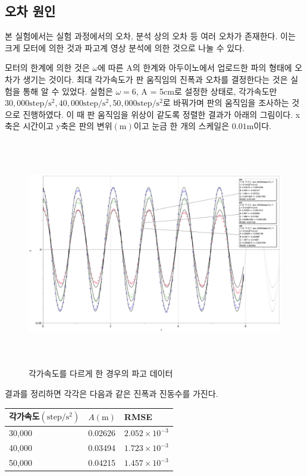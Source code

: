 \subsection{오차 원인}

본 실험에서는 실험 과정에서의 오차, 분석 상의 오차 등 여러 오차가 존재한다. 이는 크게 모터에 의한 것과 파고계 영상 분석에 의한 것으로 나눌 수 있다.

모터의 한계에 의한 것은 $\omega$에 따른 A의 한계와 아두이노에서 업로드한 파의 형태에 오차가 생기는 것이다. 최대 각가속도가 판 움직임의 진폭과 오차를 결정한다는 것은 실험을 통해 알 수 있었다. 실험은 $\omega = 6$, A = 5cm로 설정한 상태로, 각가속도만 $30,000\mathrm{step/s^2}, 40,000\mathrm{step/s^2}, 50,000\mathrm{step/s^2}$로 바꿔가며 판의 움직임을 조사하는 것으로 진행하였다. 이 때 판 움직임을 위상이 같도록 정렬한 결과가 아래의 그림이다. x축은 시간이고 y축은 판의 변위$(\mathrm{m})$이고 눈금 한 개의 스케일은 $0.01\mathrm{m}$이다.

\begin{figure}[H]
    \centering
    \includegraphics[width = 15cm, height = 10cm]{images/singraphofdiffacc.png}
    \caption{각가속도를 다르게 한 경우의 파고 데이터}
    \label{fig:enter-label}
\end{figure}
결과를 정리하면 각각은 다음과 같은 진폭과 진동수를 가진다.


\begin{table}[H]
    \centering
    \begin{tabular}{l|ll}
    \hline
    각가속도$(\mathrm{step/s^{2}})$ & $A (\mathrm{m})$ & RMSE \\
    \hline
    30,000 & 0.02626 & $2.052\times10^{-3}$ \\
    40,000 & 0.03494 & $1.723\times10^{-3}$ \\
    50,000 & 0.04215 & $1.457\times10^{-3}$\\
    \hline
    \end{tabular}%
\end{table}

